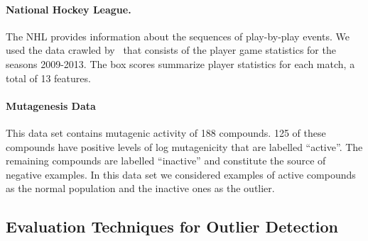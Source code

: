 {				%
				\paragraph{National Hockey League.} 
				The NHL provides information about the sequences of play-by-play events. We used the data crawled by~\citep{schulte2014aggregating} that consists of the player game statistics for the seasons 2009-2013. The box scores summarize player statistics for each match, a total of 13 features. \\
				
				\paragraph{Mutagenesis Data}
				This data set contains mutagenic activity of 188 compounds. 125 of these compounds have positive levels of log mutagenicity that are labelled ``active''.  The remaining compounds are labelled ``inactive'' and constitute the source of negative examples. In this data set we considered examples of active compounds as the normal population and the inactive ones as the outlier. 
				
				\subsection{Evaluation Techniques for Outlier Detection}
				
}
